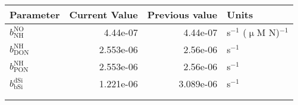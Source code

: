    \small
   \centering
   \begin{tabular}{lrrl}\toprule
    Parameter & Current Value & Previous value & Units \\ \midrule
     $b_{\textrm{NH}}^{\textrm{NO}}$ & 4.44e-07 & 4.44e-07 & s$^{-1}$ ($\upmu$M N)$^{-1}$ \\
     $b_{\textrm{DON}}^{\textrm{NH}}$ & 2.553e-06 & 2.56e-06 & s$^{-1}$ \\
     $b_{\textrm{PON}}^{\textrm{NH}}$ & 2.553e-06 & 2.56e-06 & s$^{-1}$ \\
     $b_{\textrm{bSi}}^{\textrm{dSi}}$ & 1.221e-06 & 3.089e-06 & s$^{-1}$ \\
   \midrule
 \\ \\   \end{tabular}
